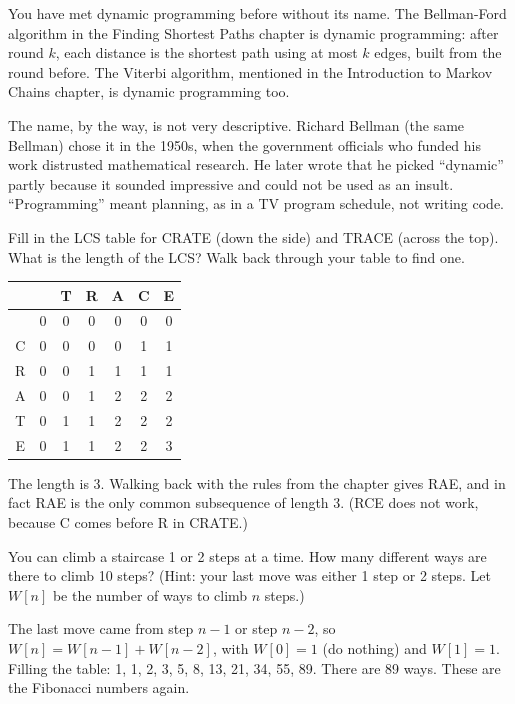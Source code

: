 You have met dynamic programming before without its name. The Bellman-Ford algorithm in the Finding Shortest
Paths chapter is dynamic programming: after round $k$, each distance is the shortest path using at most $k$
edges, built from the round before. The Viterbi algorithm, mentioned in the Introduction to Markov Chains chapter, is
dynamic programming too.

The name, by the way, is not very descriptive. Richard Bellman (the same Bellman) chose it in the 1950s, when the
government officials who funded his work distrusted mathematical research. He later wrote that he picked
``dynamic'' partly because it sounded impressive and could not be used as an insult.
``Programming'' meant planning, as in a TV program schedule, not writing code.

\begin{Exercise}[title={By Hand}, label=dp_hand]
Fill in the LCS table for CRATE (down the side) and TRACE (across the top). What is the length of the LCS?
Walk back through your table to find one.
\end{Exercise}
\begin{Answer}[ref=dp_hand]
\begin{tabular}{c|cccccc}
 & & T & R & A & C & E \\
\hline
 & 0 & 0 & 0 & 0 & 0 & 0 \\
C & 0 & 0 & 0 & 0 & 1 & 1 \\
R & 0 & 0 & 1 & 1 & 1 & 1 \\
A & 0 & 0 & 1 & 2 & 2 & 2 \\
T & 0 & 1 & 1 & 2 & 2 & 2 \\
E & 0 & 1 & 1 & 2 & 2 & 3 \\
\end{tabular}

The length is 3. Walking back with the rules from the chapter gives RAE, and in fact RAE is the only common
subsequence of length 3. (RCE does not work, because C comes before R in CRATE.)
\end{Answer}

\begin{Exercise}[title={Climbing Stairs}, label=dp_stairs]
You can climb a staircase 1 or 2 steps at a time. How many different ways are there to climb 10 steps? (Hint:
your last move was either 1 step or 2 steps. Let $W[n]$ be the number of ways to climb $n$ steps.)
\end{Exercise}
\begin{Answer}[ref=dp_stairs]
The last move came from step $n - 1$ or step $n - 2$, so $W[n] = W[n-1] + W[n-2]$, with $W[0] = 1$ (do nothing)
and $W[1] = 1$. Filling the table: 1, 1, 2, 3, 5, 8, 13, 21, 34, 55, 89. There are 89 ways. These are the
Fibonacci numbers again.
\end{Answer}

